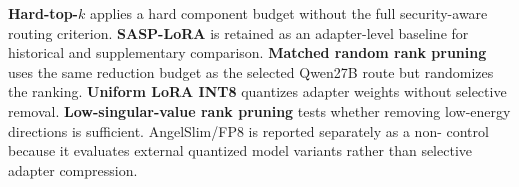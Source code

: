 \textbf{Hard-top-$k$} applies a hard component budget without the full security-aware routing criterion.
\textbf{SASP-LoRA} is retained as an adapter-level baseline for historical and supplementary comparison.
\textbf{Matched random rank pruning} uses the same reduction budget as the selected Qwen27B route but randomizes the ranking.
\textbf{Uniform LoRA INT8} quantizes adapter weights without selective removal.
\textbf{Low-singular-value rank pruning} tests whether removing low-energy directions is sufficient.
AngelSlim/FP8 is reported separately as a non-\sac{} control because it evaluates external quantized model variants rather than selective adapter compression.
